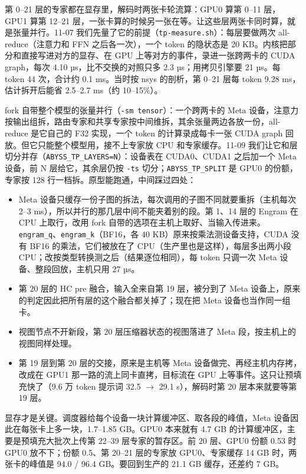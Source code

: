 \documentclass[11pt,a4paper]{article}
\newcommand{\code}[1]{\texttt{#1}}
\begin{document}
第 0--21 层的专家都在显存里，解码时两张卡轮流算：GPU0 算第 0--11 层，GPU1 算第 12--21 层，一张卡算的时候另一张在等。让这些层两张卡同时算，就是张量并行。11-07 我们先量了它的前提（\code{tp-measure.sh}）：每层要做两次 all-reduce（注意力和 FFN 之后各一次），一个 token 的隐状态是 20 KB。内核把部分和直接写进对方的显存、在 GPU 上等对方的事件，录进一张跨两卡的 CUDA graph，每次 4.10 µs，比不交换的对照只多 2.3 µs；用拷贝引擎要 21 µs。每 token 44 次，合计约 0.1 ms。当时按 nsys 的剖析，第 0--21 层每 token 9.28 ms，估计拆开后能省 2.5--2.7 ms（约 10--15\%）。

fork 自带整个模型的张量并行（\code{-sm tensor}）：一个跨两卡的 Meta 设备，注意力按输出组拆，路由专家和共享专家按中间维拆，其余张量两边各放一份，all-reduce 是它自己的 F32 实现，一个 token 的计算录成每卡一张 CUDA graph 回放。但它只能整个模型用，接不上专家放 CPU 和专家缓存。11-09 我们让它和层切分并存（\code{ABYSS\_TP\_LAYERS=N}）：设备表在 CUDA0、CUDA1 之后加一个 Meta 设备，前 N 层给它，其余层仍按 \code{-ts} 切分；\code{ABYSS\_TP\_SPLIT} 是 GPU0 的份额，专家按 128 行一档拆。原型能跑通，中间踩过四处：

\begin{itemize}
  \item Meta 设备只缓存一份子图的拆法，每次调用的子图不同就要重拆（主机每次 2--3 ms），所以并行的那几层中间不能夹着别的段。第 1、14 层的 Engram 在 CPU 上取行，改用 fork 自带的选项在主机上取好、当输入传进来。\code{engram\_q}、\code{engram\_k}（BF16，各 40 KB）原来按乘法测设备支持，CUDA 没有 BF16 的乘法，它们被放在了 CPU（生产里也是这样），每层多出两小段 CPU；改按类型转换测之后（结果逐位相同），每 token 只调一次 Meta 设备、整段回放，主机只用 27 µs。
  \item 第 20 层的 HC pre 融合，输入全来自第 19 层，被分到了 Meta 设备上，原来的判定因此把所有层的这个融合都关掉了；现在把 Meta 设备也当作同一组卡。
  \item 视图节点不开新段，第 20 层压缩器状态的视图落进了 Meta 段，按主机上的视图同样处理。
  \item 第 19 层到第 20 层的交接，原来是主机等 Meta 设备做完、再经主机内存拷，改成在 GPU1 那一路的流上同卡直拷，目标流在 GPU 上等事件。这只让预填充快了（9.6 万 token 提示词 32.5 $\to$ 29.1 s），解码时第 20 层本来就要等第 19 层。
\end{itemize}

显存才是关键。调度器给每个设备一块计算缓冲区、取各段的峰值，Meta 设备因此在每张卡上多一块，1.7--1.85 GB。GPU0 本来就有 4.7 GB 的计算缓冲区，主要是预填充大批次上传第 22--39 层专家的暂存区。前 20 层、GPU0 份额 0.53 时 GPU0 放不下；份额 0.5、第 20--21 层的专家放 GPU0、专家缓存 14 GB 时，两张卡的峰值是 94.0 / 96.4 GB。要回到生产的 21.1 GB 缓存，还差约 7 GB。
\end{document}
